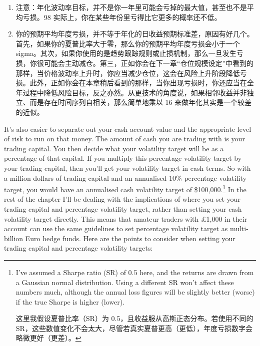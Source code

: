 \begin{enumerate}
\item 注意：年化波动率目标，并不是你一年里可能会亏掉的最大值，甚至也不是平均亏损。98 实际上，你在某些年份里亏得比它更多的概率还不低。
\item 你的预期平均年度亏损，并不等于年化的日收益预期标准差，原因有好几个。首先，如果你的夏普比率大于零，那么你的预期平均年度亏损会小于一个 sigma。其次，如果你使用的是趋势跟踪规则或止损机制，那么一旦发生亏损，你很可能会主动减仓。第三，正如你会在下一章“仓位规模设定”中看到的那样，当价格波动率上升时，你应当减少仓位，这会在风险上升阶段降低亏损。此外，正如你会在本章稍后看到的那样，当你出现亏损时，你还应当在全年过程中降低风险目标，反之亦然。从更技术的角度说，如果相邻收益并非独立、而是存在时间序列自相关，那么简单地乘以 16 来做年化其实是一个较差的近似。\end{enumerate}

\begin{englishblock} It's also easier to separate out your cash account value and the appropriate level of risk to run on that money. The amount of cash you are trading with is your trading capital. You then decide what your volatility target will be as a percentage of that capital. If you multiply this percentage volatility target by your trading capital, then you'll get your volatility target in cash terms. So with a million dollars of trading capital and an annualised 10\% percentage volatility target, you would have an annualised cash volatility target of \$100,000.\footnote{I've assumed a Sharpe ratio (SR) of 0.5 here, and the returns are drawn from a Gaussian normal distribution. Using a different SR won't affect these numbers much, although the annual loss figures will be slightly better (worse) if the true Sharpe is higher (lower). \par 这里我假设夏普比率（SR）为 0.5，且收益服从高斯正态分布。若使用不同的 SR，这些数值变化不会太大，尽管若真实夏普更高（更低），年度亏损数字会略微更好（更差）。} In the rest of the chapter I'll be dealing with the implications of where you set your trading capital and percentage volatility target, rather than setting your cash volatility target directly. This means that amateur traders with £1,000 in their account can use the same guidelines to set percentage volatility target as multi-billion Euro hedge funds. Here are the points to consider when setting your trading capital and percentage volatility targets: \end{englishblock}

